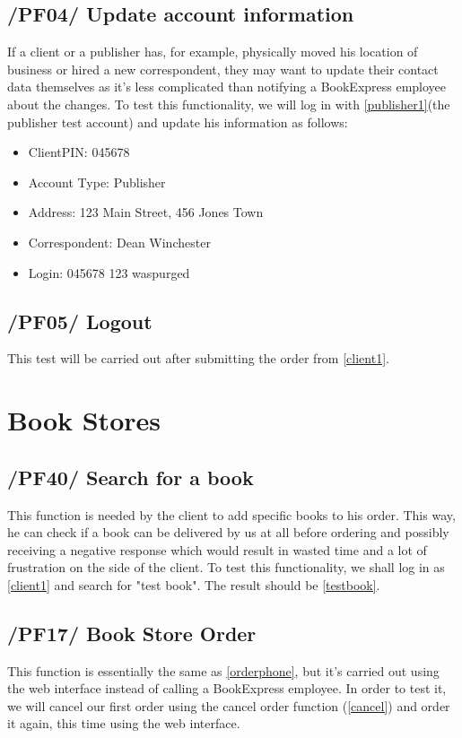 \documentclass[11pt,a4paper,oneside,svgnames]{report}
\begin{document}
\subsection{/PF04/ Update account information}
If a client or a publisher has, for example, physically moved his location of business or hired a new correspondent, they may want to update their contact data themselves as it's less complicated than notifying a BookExpress employee about the changes. To test this functionality, we will log in with \ref{publisher1}(the publisher test account) and update his information as follows:
\begin{itemize}
\item{ClientPIN: 045678}
\item{Account Type: Publisher}
\item{Address: 123 Main Street, 456 Jones Town}
\item{Correspondent: Dean Winchester}
\item{Login: 045678 123 waspurged}
\end{itemize}
\subsection{/PF05/ Logout}
This test will be carried out after submitting the order from \ref{client1}.
\section{Book Stores}   
\subsection{/PF40/ Search for a book}
This function is needed by the client to add specific books to his order. This way, he can check if a book can be delivered by us at all before ordering and possibly receiving a negative response which would result in wasted time and a lot of frustration on the side of the client. To test this functionality, we shall log in as \ref{client1} and search for "test book". The result should be \ref{testbook}.
\subsection{/PF17/ Book Store Order}
\label{orderfinal}
This function is essentially the same as \ref{orderphone}, but it's carried out using the web interface instead of calling a BookExpress employee. In order to test it, we will cancel our first order using the cancel order function (\ref{cancel}) and order it again, this time using the web interface.
\end{document}
